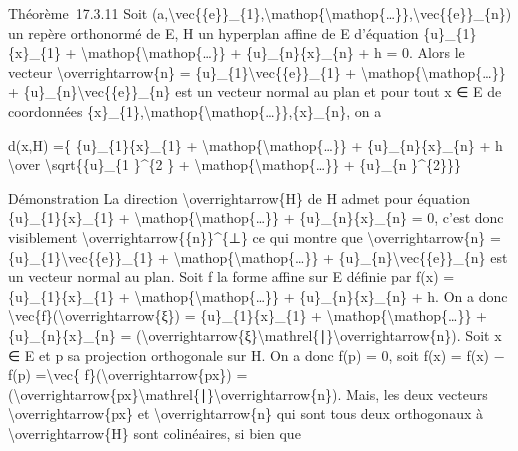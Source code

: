 \documentclass[]{article}
\begin{document}
Théorème~17.3.11 Soit
(a,\textbackslash{}vec\{\{e\}\}\_\{1\},\textbackslash{}mathop\{\textbackslash{}mathop\{\ldots{}\}\},\textbackslash{}vec\{\{e\}\}\_\{n\})
un repère orthonormé de E, H un hyperplan affine de E d'équation
\{u\}\_\{1\}\{x\}\_\{1\} +
\textbackslash{}mathop\{\textbackslash{}mathop\{\ldots{}\}\} +
\{u\}\_\{n\}\{x\}\_\{n\} + h = 0. Alors le vecteur
\textbackslash{}overrightarrow\{n\} =
\{u\}\_\{1\}\textbackslash{}vec\{\{e\}\}\_\{1\} +
\textbackslash{}mathop\{\textbackslash{}mathop\{\ldots{}\}\} +
\{u\}\_\{n\}\textbackslash{}vec\{\{e\}\}\_\{n\} est un vecteur normal au
plan et pour tout x ∈ E de coordonnées
\{x\}\_\{1\},\textbackslash{}mathop\{\textbackslash{}mathop\{\ldots{}\}\},\{x\}\_\{n\},
on a

d(x,H) =\{ \textbar{}\{u\}\_\{1\}\{x\}\_\{1\} +
\textbackslash{}mathop\{\textbackslash{}mathop\{\ldots{}\}\} +
\{u\}\_\{n\}\{x\}\_\{n\} + h\textbar{} \textbackslash{}over
\textbackslash{}sqrt\{\{u\}\_\{1 \}\^{}\{2 \} +
\textbackslash{}mathop\{\textbackslash{}mathop\{\ldots{}\}\} +
\{u\}\_\{n \}\^{}\{2\}\}\}

Démonstration La direction \textbackslash{}overrightarrow\{H\} de H
admet pour équation \{u\}\_\{1\}\{x\}\_\{1\} +
\textbackslash{}mathop\{\textbackslash{}mathop\{\ldots{}\}\} +
\{u\}\_\{n\}\{x\}\_\{n\} = 0, c'est donc visiblement
\textbackslash{}overrightarrow\{\{n\}\}\^{}\{⊥\} ce qui montre que
\textbackslash{}overrightarrow\{n\} =
\{u\}\_\{1\}\textbackslash{}vec\{\{e\}\}\_\{1\} +
\textbackslash{}mathop\{\textbackslash{}mathop\{\ldots{}\}\} +
\{u\}\_\{n\}\textbackslash{}vec\{\{e\}\}\_\{n\} est un vecteur normal au
plan. Soit f la forme affine sur E définie par f(x) =
\{u\}\_\{1\}\{x\}\_\{1\} +
\textbackslash{}mathop\{\textbackslash{}mathop\{\ldots{}\}\} +
\{u\}\_\{n\}\{x\}\_\{n\} + h. On a donc
\textbackslash{}vec\{f\}(\textbackslash{}overrightarrow\{ξ\}) =
\{u\}\_\{1\}\{x\}\_\{1\} +
\textbackslash{}mathop\{\textbackslash{}mathop\{\ldots{}\}\} +
\{u\}\_\{n\}\{x\}\_\{n\} =
(\textbackslash{}overrightarrow\{ξ\}\textbackslash{}mathrel\{∣\}\textbackslash{}overrightarrow\{n\}).
Soit x ∈ E et p sa projection orthogonale sur H. On a donc f(p) = 0,
soit f(x) = f(x) − f(p) =\textbackslash{}vec\{
f\}(\textbackslash{}overrightarrow\{px\}) =
(\textbackslash{}overrightarrow\{px\}\textbackslash{}mathrel\{∣\}\textbackslash{}overrightarrow\{n\}).
Mais, les deux vecteurs \textbackslash{}overrightarrow\{px\} et
\textbackslash{}overrightarrow\{n\} qui sont tous deux orthogonaux à
\textbackslash{}overrightarrow\{H\} sont colinéaires, si bien que
\end{document}
